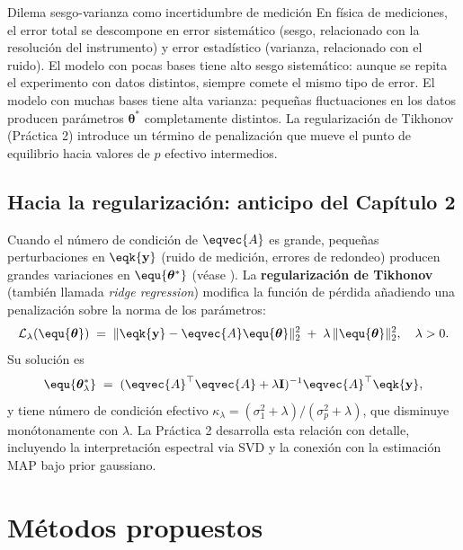 \begin{fisicaconexion}{Dilema sesgo-varianza como incertidumbre de medición}
En física de mediciones, el error total se descompone en error sistemático
(sesgo, relacionado con la resolución del instrumento) y error estadístico
(varianza, relacionado con el ruido). El modelo con pocas bases tiene alto
sesgo sistemático: aunque se repita el experimento con datos distintos,
siempre comete el mismo tipo de error. El modelo con muchas bases tiene
alta varianza: pequeñas fluctuaciones en los datos producen parámetros
$\boldsymbol{\theta}^*$ completamente distintos. La regularización de
Tikhonov (Práctica 2) introduce un término de penalización que mueve el
punto de equilibrio hacia valores de $p$ efectivo intermedios.
\end{fisicaconexion}

\subsection*{Hacia la regularización: anticipo del Capítulo 2}
\label{sec:regularizacion_preview}

Cuando el número de condición de $\eqvec{A}$ es grande, pequeñas
perturbaciones en $\eqk{\mathbf{y}}$ (ruido de medición, errores de
redondeo) producen grandes variaciones en $\equ{\boldsymbol{\theta}^*}$
(véase ). La \textbf{regularización de Tikhonov}
(también llamada \textit{ridge regression}) modifica la función de pérdida
añadiendo una penalización sobre la norma de los parámetros:
\[
  \mathcal{L}_\lambda(\equ{\boldsymbol{\theta}}) \;=\;
  \|\eqk{\mathbf{y}} - \eqvec{A}\equ{\boldsymbol{\theta}}\|_2^2
  \;+\; \lambda\,\|\equ{\boldsymbol{\theta}}\|_2^2,
  \quad \lambda > 0.
\]
Su solución es
\[
  \equ{\boldsymbol{\theta}^*_\lambda}
  \;=\; (\eqvec{A}^\top\eqvec{A} + \lambda\mathbf{I})^{-1}\eqvec{A}^\top\eqk{\mathbf{y}},
\]
y tiene número de condición efectivo
$\kappa_\lambda = (\sigma_1^2 + \lambda)/(\sigma_p^2 + \lambda)$, que
disminuye monótonamente con $\lambda$. La Práctica 2 desarrolla esta
relación con detalle, incluyendo la interpretación espectral via SVD y
la conexión con la estimación MAP bajo prior gaussiano.

\section*{Métodos propuestos}
\label{sec:metodos}

